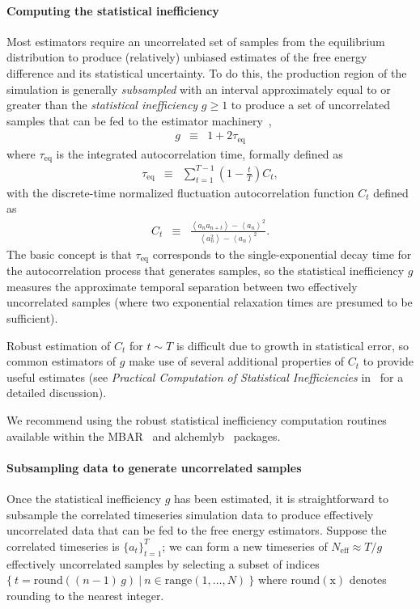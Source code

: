 \documentclass[9pt,bestpractices]{livecoms}
\newcommand{\expect}[1]{\left\langle{#1}\right\rangle}
\begin{document}
\paragraph{Computing the statistical inefficiency}
Most estimators require an uncorrelated set of samples from the equilibrium distribution to produce (relatively) unbiased estimates of the free energy difference and its statistical uncertainty.
To do this, the production region of the simulation is generally \emph{subsampled} with an interval approximately equal to or greater than the \emph{statistical inefficiency} $g \ge 1$ to produce a set of uncorrelated samples that can be fed to the estimator machinery~\cite{chodera2016simple},
\begin{eqnarray}
g &\equiv& 1 + 2 \tau_\mathrm{eq} \label{eq:statistical-inefficiency-definition}
\end{eqnarray}
where $\tau_\mathrm{eq}$ is the integrated autocorrelation time, formally defined as
\begin{eqnarray}
\tau_\mathrm{eq} &\equiv& \sum_{t=1}^{T-1} \left(1 - \frac{t}{T}\right) C_t \label{eq:integrated-autocorrelation-time-definition} , 
\end{eqnarray}
with the discrete-time normalized fluctuation autocorrelation function $C_t$ defined as
\begin{eqnarray}
C_t &\equiv& \frac{\expect{a_n a_{n+t}} - \expect{a_n}^2}{\expect{a_n^2} - \expect{a_n}^2} . \label{equation:autocorrelation-definition}
\end{eqnarray}
The basic concept is that $\tau_\mathrm{eq}$ corresponds to the single-exponential decay time for the autocorrelation process that generates samples, so the statistical inefficiency $g$ measures the approximate temporal separation between two effectively uncorrelated samples (where two exponential relaxation times are presumed to be sufficient).

Robust estimation of $C_t$ for $t \sim T$ is difficult due to growth in statistical error, so common estimators of $g$ make use of several additional properties of $C_t$ to provide useful estimates (see \emph{Practical Computation of Statistical Inefficiencies} in~\cite{chodera2016simple} for a detailed discussion).

We recommend using the robust statistical inefficiency computation routines available within the MBAR~\cite{kylebeauchamp2019choderalab} and alchemlyb~\cite{daviddotson2019alchemistry} packages.

\paragraph{Subsampling data to generate uncorrelated samples}
Once the statistical inefficiency $g$ has been estimated, it is straightforward to subsample the correlated timeseries simulation data to produce effectively uncorrelated data that can be fed to the free energy estimators.
Suppose the correlated timeseries is $\{a_t\}_{t=1}^T$; we can form a new timeseries of $N_{\mathrm{eff}} \approx T / g$ effectively uncorrelated samples by selecting a subset of indices $\{ \: t = \mathrm{round}((n-1) \, g) \: | \: n \in \mathrm{range}(1,\ldots ,N) \: \}$ where $\mathrm{round(x)}$ denotes rounding to the nearest integer.
\end{document}
